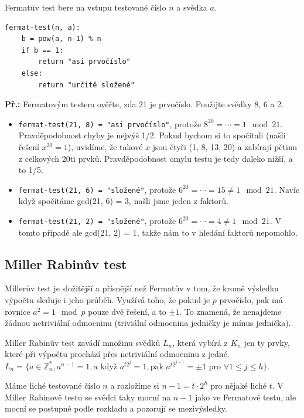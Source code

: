Fermatův test bere na vstupu testované číslo $n$ a svědka $a$.
\begin{verbatim}
fermat-test(n, a):
    b = pow(a, n-1) % n
    if b == 1:
        return "asi prvočíslo"
    else:
        return "určitě složené"
\end{verbatim}

\begin{exercise}
\textbf{Př.:} Fermatovým testem ověřte, zda 21 je prvočíslo. Použijte svědky 8,
6 a 2. 
\begin{itemize}
\item \texttt{fermat-test(21, 8) = "asi prvočíslo"}, protože $8^{20} = \cdots =
1 \mod 21$.  Pravděpodobnost chyby je nejvýš 1/2. Pokud bychom si to spočítali
(našli řešení $x^{20} = 1$), uvidíme, že takové $x$ jsou čtyři (1, 8, 13, 20) a
zabírají pětinu z celkových 20ti prvků. Pravděpodobnost omylu testu je tedy
daleko nižší, a to 1/5.
\item \texttt{fermat-test(21, 6) = "složené"}, protože $6^{20} = \cdots = 15
\neq 1 \mod 21$. Navíc když spočítáme gcd(21, 6) = 3, našli jsme jeden z
faktorů.
\item \texttt{fermat-test(21, 2) = "složené"}, protože $6^{20} = \cdots = 4\neq
1 \mod 21$. V tomto případě ale gcd(21, 2) = 1, takže nám to v hledání faktorů
nepomohlo.
\end{itemize}
\end{exercise}

\subsection{Miller Rabinův test}
Millerův test je složitější a přísnější než Fermatův v tom, že kromě výsledku
výpočtu sleduje i jeho průběh. Využívá toho, že pokud je $p$ prvočíslo, pak má
rovnice $a^2 = 1 \mod p$ pouze dvě řešení, a to $\pm 1$. To znamená, že
nenajdeme žádnou netriviální odmocninu (triviální odmocnina jedničky je mínus
jednička).

Miller Rabinův test zavádí množinu svědků $L_n$, která vybírá z $K_n$ jen ty
prvky, které při výpočtu prochází přes netriviální odmocninu z jedné. $L_n = \{a
\in \mathbb{Z}_n^*, a^{n-1} = 1, \text{a když } a^{t2^j} = 1, \text{pak }
a^{t2^{j-1}} = \pm 1 \text{ pro } \forall 1 \leq j \leq h \}$.

Máme liché testované číslo $n$ a rozložíme si $n-1 = t \cdot 2^h$ pro nějaké
liché $t$. V Miller Rabinově testu se svědci taky mocní na $n-1$ jako ve
Fermatově testu, ale mocní se postupně podle rozkladu a pozorují se
mezivýsledky.

